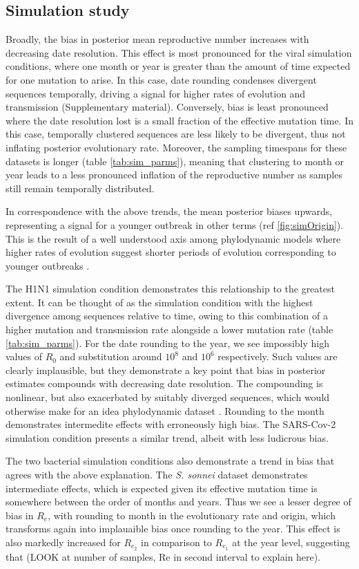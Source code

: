 \documentclass{article}
\begin{document}
\begin{spacing}{1.5}
\subsection*{Simulation study}
Broadly, the bias in posterior mean reproductive number increases with decreasing date resolution. This effect is most pronounced for the viral simulation conditions, where one month or year is greater than the amount of time expected for one mutation to arise. In this case, date rounding condenses divergent sequences temporally, driving a signal for higher rates of evolution and transmission (Supplementary material). Conversely, bias is least pronounced where the date resolution lost is a small fraction of the effective mutation time. In this case, temporally clustered sequences are less likely to be divergent, thus not inflating posterior evolutionary rate. Moreover, the sampling timespans for these datasets is longer (table \ref{tab:sim_parms}), meaning that clustering to month or year leads to a less pronounced inflation of the reproductive number as samples still remain temporally distributed.

In correspondence with the above trends, the mean posterior biases upwards, representing a signal for a younger outbreak in other terms (ref \ref{fig:simOrigin}). This is the result of a well understood axis among phylodynamic models where higher rates of evolution suggest shorter periods of evolution corresponding to younger outbreaks \citep{featherstone_decoding_2023}.

The H1N1 simulation condition demonstrates this relationship to the greatest extent. It can be thought of as the simulation condition with the highest divergence among sequences relative to time, owing to this combination of a higher mutation and transmission rate alongside a lower mutation rate (table \ref{tab:sim_parms}). For the date rounding to the year, we see impossibly high values of $R_0$ and substitution around $10^{8}$ and $10^{6}$ respectively. Such values are clearly implausible, but they demonstrate a key point that bias in posterior estimates compounds with decreasing date resolution. The compounding is nonlinear, but also exacerbated by suitably diverged sequences, which would otherwise make for an idea phylodynamic dataset \citep{featherstone_decoding_2023}. Rounding to the month demonstrates intermedite effects with erroneously high bias. The SARS-Cov-2 simulation condition presents a similar trend, albeit with less ludicrous bias. 

The two bacterial simulation conditions also demonstrate a trend in bias that agrees with the above explanation. The \textit{S. sonnei} dataset demonstrates intermediate effects, which is expected given its effective mutation time is somewhere between the order of months and years. Thus we see a lesser degree of bias in $R_{e}$, with rounding to month in the evolutionary rate and origin, which transforms again into implauaible bias once rounding to the year. This effect is also markedly increased for $R_{e_2}$ in comparison to $R_{e_1}$ at the year level,  suggesting that (LOOK at number of samples, Re in second interval to explain here). 


\end{spacing}
\end{document}
